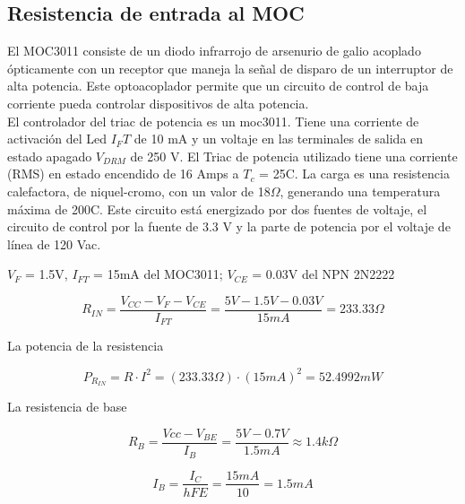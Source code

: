 \subsection{Resistencia de entrada al MOC}
    El MOC3011 consiste de un diodo infrarrojo de arsenurio de galio acoplado ópticamente con un receptor  que maneja  la señal de disparo de un interruptor de alta potencia. Este optoacoplador permite que un circuito de control de baja corriente pueda controlar dispositivos de alta potencia.\\
    El controlador del triac de potencia es un moc3011. Tiene una corriente de activación del Led $I_FT$ de 10 mA y un voltaje en las terminales de salida en estado apagado $V_{DRM}$ de 250 V. El Triac de potencia utilizado tiene una corriente (RMS) en estado encendido de 16 Amps a $T_{c}$ = 25C. La carga es una resistencia calefactora, de niquel-cromo, con un valor de 18$\Omega$, generando una temperatura máxima de 200C. Este circuito está energizado por dos fuentes de voltaje, el circuito de control por la fuente de 3.3 V y la parte de potencia por el voltaje de línea de 120 Vac. 
    
    $V_F$ = 1.5V, $I_{FT}$ = 15mA del MOC3011;  $V_{CE}$ = 0.03V del NPN 2N2222
    
    \begin{equation}
        R_{IN} 
        =   \frac { V_{CC} - V_{F} - V_{CE} } { I_{FT} }
        =   \frac { 5V - 1.5V - 0.03V } { 15mA }
        =   233.33\Omega
    \end{equation}
     
    La potencia de la resistencia
    
    \begin{equation}
        P_{ R_{IN} }
        =   R \cdot I^2
        =   (233.33\Omega) \cdot (15mA)^2
        =   52.4992mW
    \end{equation}
    
    La resistencia de base
    
    \begin{equation}
        R_{B}   
        =   \frac { Vcc - V_{BE} } { I_{B} }
        =   \frac { 5V - 0.7V } { 1.5mA }
        \approx   1.4k\Omega
    \end{equation}
    
    \begin{equation}
        I_{B}   
        =   \frac { I_{C} } { hFE }
        =   \frac { 15mA } { 10 }
        =   1.5mA
    \end{equation}
    

